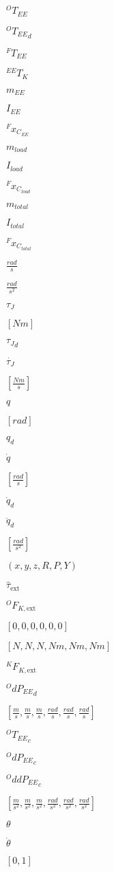 \documentclass{article}
\begin{document}
$^{O}T_{EE}$
\pagebreak

${^OT_{EE}}_{d}$
\pagebreak

$^{F}T_{EE}$
\pagebreak

$^{EE}T_{K}$
\pagebreak

$m_{EE}$
\pagebreak

$I_{EE}$
\pagebreak

$^{F}x_{C_{EE}}$
\pagebreak

$m_{load}$
\pagebreak

$I_{load}$
\pagebreak

$^{F}x_{C_{load}}$
\pagebreak

$m_{total}$
\pagebreak

$I_{total}$
\pagebreak

$^{F}x_{C_{total}}$
\pagebreak

$\frac{rad}{s}$
\pagebreak

$\frac{rad}{s^2}$
\pagebreak

$\tau_{J}$
\pagebreak

$[Nm]$
\pagebreak

${\tau_J}_d$
\pagebreak

$\dot{\tau_{J}}$
\pagebreak

$[\frac{Nm}{s}]$
\pagebreak

$q$
\pagebreak

$[rad]$
\pagebreak

$q_d$
\pagebreak

$\dot{q}$
\pagebreak

$[\frac{rad}{s}]$
\pagebreak

$\dot{q}_d$
\pagebreak

$\ddot{q}_d$
\pagebreak

$[\frac{rad}{s^2}]$
\pagebreak

$(x,y,z,R,P,Y)$
\pagebreak

$\hat{\tau}_{\text{ext}}$
\pagebreak

$^OF_{K,\text{ext}}$
\pagebreak

$[0,0,0,0,0,0]$
\pagebreak

$[N,N,N,Nm,Nm,Nm]$
\pagebreak

$^{K}F_{K,\text{ext}}$
\pagebreak

${^OdP_{EE}}_{d}$
\pagebreak

$[\frac{m}{s},\frac{m}{s},\frac{m}{s},\frac{rad}{s},\frac{rad}{s},\frac{rad}{s}]$
\pagebreak

${^OT_{EE}}_{c}$
\pagebreak

${^OdP_{EE}}_{c}$
\pagebreak

${^OddP_{EE}}_{c}$
\pagebreak

$[\frac{m}{s^2},\frac{m}{s^2},\frac{m}{s^2},\frac{rad}{s^2},\frac{rad}{s^2},\frac{rad}{s^2}]$
\pagebreak

$\theta$
\pagebreak

$\dot{\theta}$
\pagebreak

$[0, 1]$
\pagebreak
\end{document}
